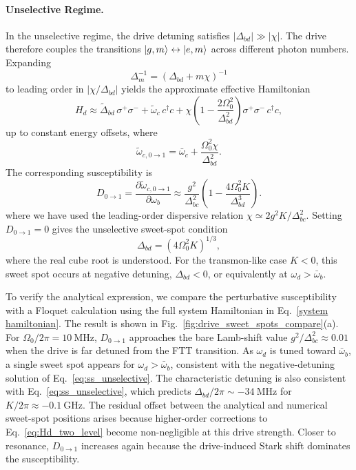 \paragraph{Unselective Regime.}
In the unselective regime, the drive detuning satisfies \(|\Delta_{bd}|\gg|\chi|\). The drive therefore couples the transitions \(\ket{g,m}\leftrightarrow\ket{e,m}\) across different photon numbers. Expanding
\[
\Delta_m^{-1}=(\Delta_{bd}+m\chi)^{-1}
\]
to leading order in \(|\chi/\Delta_{bd}|\) yields the approximate effective Hamiltonian
\begin{equation}
\label{eq:Hd_far_detuned}
H_d \approx
\widetilde{\Delta}_{bd}\,\sigma^+\sigma^-
+\widetilde{\omega}_{c}\,c^\dagger c
+\chi\left(1-\frac{2\Omega_0^2}{\Delta_{bd}^2}\right)\sigma^+\sigma^-\,c^\dagger c ,
\end{equation}
up to constant energy offsets, where
\begin{equation}
\widetilde{\omega}_{c,0\to1}
=
\bar{\omega}_c+\frac{\Omega_0^2\chi}{\Delta_{bd}^2}.
\end{equation}
The corresponding susceptibility is
\begin{equation}
\label{eq:D01_unselective}
D_{0\to1} = \frac{\partial \widetilde{\omega}_{c,0\to1}}{\partial \omega_b}
\approx \frac{g^2}{\Delta_{bc}^2}
\left(1-\frac{4\Omega_0^2K}{\Delta_{bd}^3}\right).
\end{equation}
where we have used the leading-order dispersive relation \(\chi\simeq 2g^2K/\Delta_{bc}^2\). Setting \(D_{0\to1}=0\) gives the unselective sweet-spot condition
\begin{equation}
\label{eq:ss_unselective}
\Delta_{bd}=(4\Omega_0^2K)^{1/3},
\end{equation}
where the real cube root is understood. For the transmon-like case \(K<0\), this sweet spot occurs at negative detuning, \(\Delta_{bd}<0\), or equivalently at \(\omega_d>\bar{\omega}_b\).

To verify the analytical expression, we compare the perturbative susceptibility with a Floquet calculation using the full system Hamiltonian in Eq.~\eqref{system hamiltonian}. The result is shown in Fig.~\ref{fig:drive_sweet_spots_compare}(a). For \(\Omega_0/2\pi=10~\mathrm{MHz}\), \(D_{0 \rightarrow 1}\) approaches the bare Lamb-shift value \(g^2/\Delta_{bc}^2\approx0.01\) when the drive is far detuned from the FTT transition. As \(\omega_d\) is tuned toward \(\bar{\omega}_b\), a single sweet spot appears for \(\omega_d>\bar{\omega}_b\), consistent with the negative-detuning solution of Eq.~\eqref{eq:ss_unselective}. The characteristic detuning is also consistent with Eq.~\eqref{eq:ss_unselective}, which predicts \(\Delta_{bd}/2\pi\sim -34~\mathrm{MHz}\) for \(K/2\pi\approx-0.1~\mathrm{GHz}\). The residual offset between the analytical and numerical sweet-spot positions arises because higher-order corrections to Eq.~\eqref{eq:Hd_two_level} become non-negligible at this drive strength. Closer to resonance, \(D_{0 \rightarrow 1}\) increases again because the drive-induced Stark shift dominates the susceptibility.

